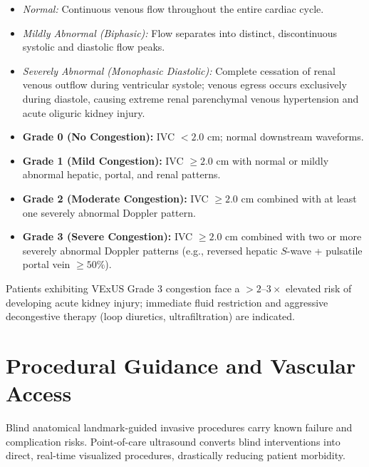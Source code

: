 \documentclass[11pt,a4paper]{article}
\begin{document}
\begin{enumerate}[leftmargin=2em]
    \begin{itemize}
        \item \textit{Normal:} Continuous venous flow throughout the entire cardiac cycle.
        \item \textit{Mildly Abnormal (Biphasic):} Flow separates into distinct, discontinuous systolic and diastolic flow peaks.
        \item \textit{Severely Abnormal (Monophasic Diastolic):} Complete cessation of renal venous outflow during ventricular systole; venous egress occurs exclusively during diastole, causing extreme renal parenchymal venous hypertension and acute oliguric kidney injury.
    \end{itemize}
\end{enumerate}

\begin{protocolbox}
\begin{itemize}[leftmargin=1.5em]
    \item \textbf{Grade 0 (No Congestion):} IVC $< 2.0\text{ cm}$; normal downstream waveforms.
    \item \textbf{Grade 1 (Mild Congestion):} IVC $\ge 2.0\text{ cm}$ with normal or mildly abnormal hepatic, portal, and renal patterns.
    \item \textbf{Grade 2 (Moderate Congestion):} IVC $\ge 2.0\text{ cm}$ combined with at least one severely abnormal Doppler pattern.
    \item \textbf{Grade 3 (Severe Congestion):} IVC $\ge 2.0\text{ cm}$ combined with two or more severely abnormal Doppler patterns (e.g., reversed hepatic $S$-wave + pulsatile portal vein $\ge 50\%$).
\end{itemize}
Patients exhibiting VExUS Grade 3 congestion face a $> 2\text{--}3\times$ elevated risk of developing acute kidney injury; immediate fluid restriction and aggressive decongestive therapy (loop diuretics, ultrafiltration) are indicated.
\end{protocolbox}

\section{Procedural Guidance and Vascular Access}
Blind anatomical landmark-guided invasive procedures carry known failure and complication risks. Point-of-care ultrasound converts blind interventions into direct, real-time visualized procedures, drastically reducing patient morbidity.
\end{document}
